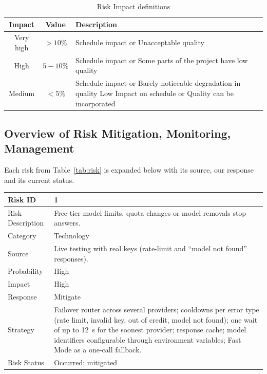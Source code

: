 \documentclass[oneside,a4paper,12pt]{report}
\begin{document}
\begin{table}[!htbp]
\begin{center}
\def\arraystretch{1.5}
\begin{tabularx}{\textwidth}{| c | c | X |}
\hline
Impact & Value	& Description \\ \hline
Very high &	$> 10 \%$ & Schedule impact or Unacceptable quality \\ \hline
High &	$5-10 \%$ & Schedule impact or Some parts of the project have low quality \\ \hline
Medium	& $ < 5 \% $ & Schedule impact or Barely noticeable degradation in quality Low	Impact on schedule or Quality can be incorporated \\ \hline
\end{tabularx}
\end{center}
\caption{Risk Impact definitions \cite{bookPressman}}
\label{tab:riskImpactDef}
\end{table}

\subsection{Overview of Risk Mitigation, Monitoring, Management}


Each risk from Table~\ref{tab:risk} is expanded below with its source, our response and its current status.
\begin{table}[!htbp]
\begin{center}
\def\arraystretch{1.5}
\begin{tabularx}{\textwidth}{| l | X |}
\hline
Risk ID	& 1 \\ \hline
Risk Description	& Free-tier model limits, quota changes or model removals stop answers. \\ \hline
Category	& Technology \\ \hline
Source	& Live testing with real keys (rate-limit and ``model not found'' responses). \\ \hline
Probability	& High \\ \hline
Impact	& High \\ \hline
Response	& Mitigate \\ \hline
Strategy	& Failover router across several providers; cooldowns per error type (rate limit, invalid key, out of credit, model not found); one wait of up to 12~s for the soonest provider; response cache; model identifiers configurable through environment variables; Fast Mode as a one-call fallback. \\ \hline
Risk Status	& Occurred; mitigated \\ \hline
\end{tabularx}
\end{center}
\label{tab:risk1}
\end{table}
\end{document}
